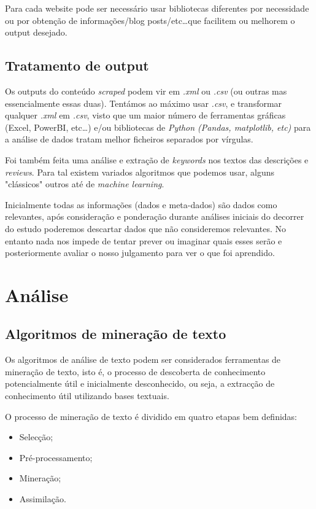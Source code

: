 Para cada website pode ser necessário usar bibliotecas diferentes por necessidade ou por obtenção de informações/blog posts/etc\ldots que facilitem ou melhorem o output desejado.

\subsection{Tratamento de output}

Os outputs do conteúdo \textit{scraped} podem vir em \textit{.xml} ou \textit{.csv} (ou outras mas essencialmente essas duas).
Tentámos ao máximo usar \textit{.csv}, e transformar qualquer \textit{.xml} em \textit{.csv}, visto que um maior número de ferramentas gráficas (Excel, PowerBI, etc\ldots) e/ou bibliotecas de \textit{Python (Pandas, matplotlib, etc)} para a análise de dados tratam melhor ficheiros separados por vírgulas.

Foi também feita uma análise e extração de \textit{keywords} nos textos das descrições e \textit{reviews}.
Para tal existem variados algoritmos que podemos usar, alguns "clássicos" outros até de \textit{machine learning}.

Inicialmente todas as informações (dados e meta-dados) são dados como relevantes, após consideração e ponderação durante análises iniciais do decorrer do estudo poderemos descartar dados que não consideremos relevantes.
No entanto nada nos impede de tentar prever ou imaginar quais esses serão e posteriormente avaliar o nosso julgamento para ver o que foi aprendido.

\section{Análise}
\subsection{Algoritmos de mineração de texto}

Os algoritmos de análise de texto podem ser considerados ferramentas de mineração de texto, isto é, o processo de descoberta de conhecimento potencialmente útil e inicialmente desconhecido, ou seja, a extracção de conhecimento útil utilizando bases textuais.

O processo de mineração de texto é dividido em quatro etapas bem definidas:
\begin{itemize}
  \setlength\itemsep{0.05em}
  \item Selecção;
  \item Pré-processamento;
  \item Mineração;
  \item Assimilação.
\end{itemize}


